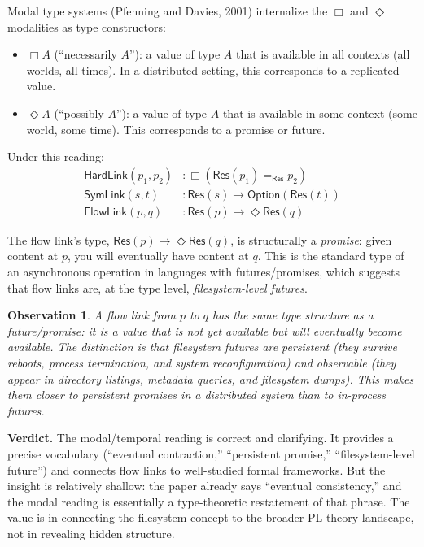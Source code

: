 \documentclass[11pt]{article}
\newtheorem{observation}{Observation}
\newcommand{\tp}[1]{\mathsf{#1}}
\newcommand{\eventually}{\Diamond}
\newcommand{\always}{\Box}
\begin{document}
Modal type systems (Pfenning and Davies, 2001) internalize the $\always$ and
$\eventually$ modalities as type constructors:

\begin{itemize}
  \item $\always A$ (``necessarily $A$''): a value of type $A$ that is
    available in all contexts (all worlds, all times). In a distributed
    setting, this corresponds to a replicated value.
  \item $\eventually A$ (``possibly $A$''): a value of type $A$ that is
    available in some context (some world, some time). This corresponds to a
    promise or future.
\end{itemize}

Under this reading:
\begin{align}
  \tp{HardLink}(p_1, p_2) &: \always (\tp{Res}(p_1) =_{\tp{Res}} p_2)
    \tag{necessary equality} \\
  \tp{SymLink}(s, t) &: \tp{Res}(s) \to \tp{Option}(\tp{Res}(t))
    \tag{no modality, just partiality} \\
  \tp{FlowLink}(p, q) &: \tp{Res}(p) \to \eventually \tp{Res}(q)
    \tag{eventual delivery}
\end{align}

The flow link's type, $\tp{Res}(p) \to \eventually \tp{Res}(q)$, is
structurally a \emph{promise}: given content at $p$, you will eventually have
content at $q$. This is the standard type of an asynchronous operation in
languages with futures/promises, which suggests that flow links are, at the
type level, \emph{filesystem-level futures}.

\begin{observation}
A flow link from $p$ to $q$ has the same type structure as a future/promise:
it is a value that is not yet available but will eventually become available.
The distinction is that filesystem futures are \emph{persistent} (they survive
reboots, process termination, and system reconfiguration) and
\emph{observable} (they appear in directory listings, metadata queries, and
filesystem dumps). This makes them closer to \emph{persistent promises} in a
distributed system than to in-process futures.
\end{observation}

\textbf{Verdict.} The modal/temporal reading is correct and clarifying. It
provides a precise vocabulary (``eventual contraction,'' ``persistent promise,''
``filesystem-level future'') and connects flow links to well-studied formal
frameworks. But the insight is relatively shallow: the paper already says
``eventual consistency,'' and the modal reading is essentially a
type-theoretic restatement of that phrase. The value is in connecting the
filesystem concept to the broader PL theory landscape, not in revealing
hidden structure.
\end{document}
